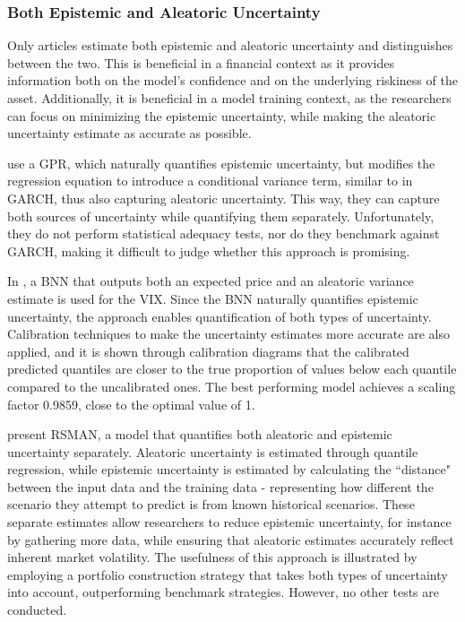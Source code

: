 \subsubsection{Both Epistemic and Aleatoric Uncertainty}
\label{sec:both_epistemic_and_aleatoric}

Only \uqdisting articles estimate both epistemic and aleatoric uncertainty and distinguishes between the two. This is beneficial in a financial context as it provides information both on the model's confidence and on the underlying riskiness of the asset. Additionally, it is beneficial in a model training context, as the researchers can focus on minimizing the epistemic uncertainty, while making the aleatoric uncertainty estimate as accurate as possible.

\textcite{Risk2018gpr} use a GPR, which naturally quantifies epistemic uncertainty, but modifies the regression equation to introduce a conditional variance term, similar to in GARCH, thus also capturing aleatoric uncertainty. This way, they can capture both sources of uncertainty while quantifying them separately. Unfortunately, they do not perform statistical adequacy tests, nor do they benchmark against GARCH, making it difficult to judge whether this approach is promising.

In \textcite{hortua2024forecasting}, a BNN that outputs both an expected price and an aleatoric variance estimate is used for the VIX. Since the BNN naturally quantifies epistemic uncertainty, the approach enables quantification of both types of uncertainty. Calibration techniques to make the uncertainty estimates more accurate are also applied, and it is shown through calibration diagrams that the calibrated predicted quantiles are closer to the true proportion of values below each quantile compared to the uncalibrated ones. The best performing model achieves a scaling factor 0.9859, close to the optimal value of 1.

\textcite{Park2024UncertaintyAware} present RSMAN, a model that quantifies both aleatoric and epistemic uncertainty separately. Aleatoric uncertainty is estimated through quantile regression, while epistemic uncertainty is estimated by calculating the ``distance" between the input data and the training data - representing how different the scenario they attempt to predict is from known historical scenarios. These separate estimates allow researchers to reduce epistemic uncertainty, for instance by gathering more data, while ensuring that aleatoric estimates accurately reflect inherent market volatility. The usefulness of this approach is illustrated by employing a portfolio construction strategy that takes both types of uncertainty into account, outperforming benchmark strategies. However, no other tests are conducted.

